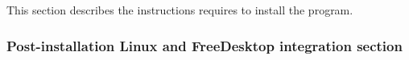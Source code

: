 This section describes the instructions requires to install the program. 
{\footnotesize{
\begin{script}
\end{script}
}}
\vspace{-1cm}
{\footnotesize{
\begin{script}
\end{script}
}}

\subsubsection{Post-installation Linux and FreeDesktop integration section}
\label{rpmpost}

